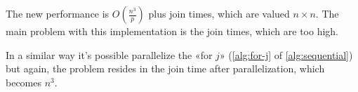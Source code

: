 The new performance is \(\displaystyle O\left(\frac{n^3}{p}\right)\) plus join times, which are valued \(n\times n\).
The main problem with this implementation is the join times, which are too high.

In a similar way it's possible parallelize the «for \(j\)» (\cref{alg:for-j} of \cref{alg:sequential}) but again, the problem resides in the join time after parallelization, which becomes \(n^3\).

\FloatBarrier
